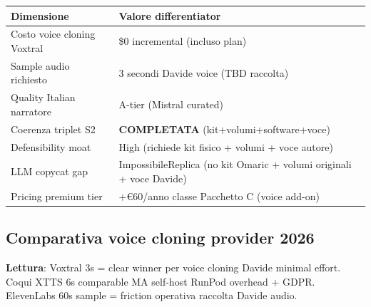 \documentclass[12pt,a4paper]{article}
\begin{document}
\begin{center}
\begin{tabular}{l l}
\toprule
\textbf{Dimensione} & \textbf{Valore differentiator} \\
\midrule
Costo voice cloning Voxtral & \$0 incremental (incluso plan) \\
Sample audio richiesto & 3 secondi Davide voice (TBD raccolta) \\
Quality Italian narratore & A-tier (Mistral curated) \\
Coerenza triplet S2 & \textbf{COMPLETATA} (kit+volumi+software+voce) \\
Defensibility moat & High (richiede kit fisico + volumi + voce autore) \\
LLM copycat gap & ImpossibileReplica (no kit Omaric + volumi originali + voce Davide) \\
Pricing premium tier & +€60/anno classe Pacchetto C (voice add-on) \\
\bottomrule
\end{tabular}
\end{center}

\subsection{Comparativa voice cloning provider 2026}

\begin{center}
\end{center}

\textbf{Lettura}: Voxtral 3s = clear winner per voice cloning Davide minimal effort. Coqui XTTS 6s comparable MA self-host RunPod overhead + GDPR. ElevenLabs 60s sample = friction operativa raccolta Davide audio.

\newpage

\end{document}

